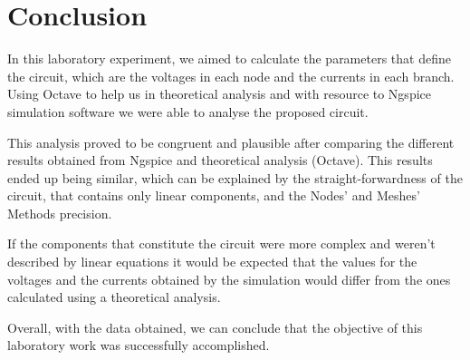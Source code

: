 \section{Conclusion}
\label{sec:conclusion}

In this laboratory experiment, we aimed to calculate the parameters that define the circuit, which are the voltages in each node and the currents in each branch.
Using Octave to help us in theoretical analysis and with resource to Ngspice simulation software we were able to analyse the proposed circuit.

This analysis proved to be congruent and plausible after comparing the different results obtained from Ngspice and theoretical analysis (Octave). This results ended up being similar, which can be explained by the straight-forwardness of the circuit, that contains only linear components, and the Nodes' and Meshes' Methods precision.

If the components that constitute the circuit were more complex and weren't described by linear equations it would be expected that the values for the voltages and the currents obtained by the simulation would differ from the ones calculated using a theoretical analysis.

Overall, with the data obtained, we can conclude that the objective of this laboratory work was successfully accomplished.
